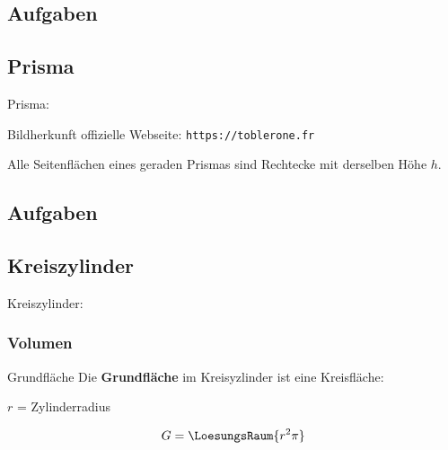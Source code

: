 \subsection*{Aufgaben}
\newpage


\subsection{Prisma}
Prisma: 

\begin{center}Bildherkunft offizielle Webseite: \texttt{https://toblerone.fr}\end{center}


\begin{bemerkung}{}{}
  Alle Seitenflächen eines geraden Prismas sind Rechtecke mit derselben Höhe $h$.
  \end{bemerkung}

\subsection*{Aufgaben}

\newpage


\subsection{Kreiszylinder}

Kreiszylinder: 


\subsubsection{Volumen}

\begin{bemerkung}{Grundfläche}{}
  Die \textbf{Grundfläche} im Kreisyzlinder ist eine Kreisfläche:

  $r$ = Zylinderradius
  
  $$G = \LoesungsRaum{r^2\pi}$$
\end{bemerkung}

